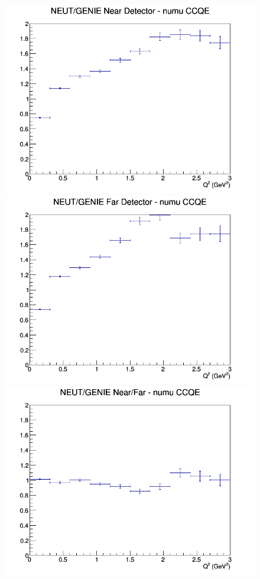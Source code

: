 \documentclass[12pt]{article}
\begin{document}
\begin{figure}[h]
\endminipage
\newline
{}
\includegraphics[width=\linewidth]{eff_Q2/GAr/ratios/CCQE_NEUT_GENIE_numu_near_Q2.png}
\endminipage
{}
\includegraphics[width=\linewidth]{eff_Q2/GAr/ratios/CCQE_NEUT_GENIE_numu_far_Q2.png}
\endminipage
{}
\includegraphics[width=\linewidth]{eff_Q2/GAr/ratios/CCQE_NEUT_GENIE_numu_NF_Q2.png}

\end{figure}
\end{document}
